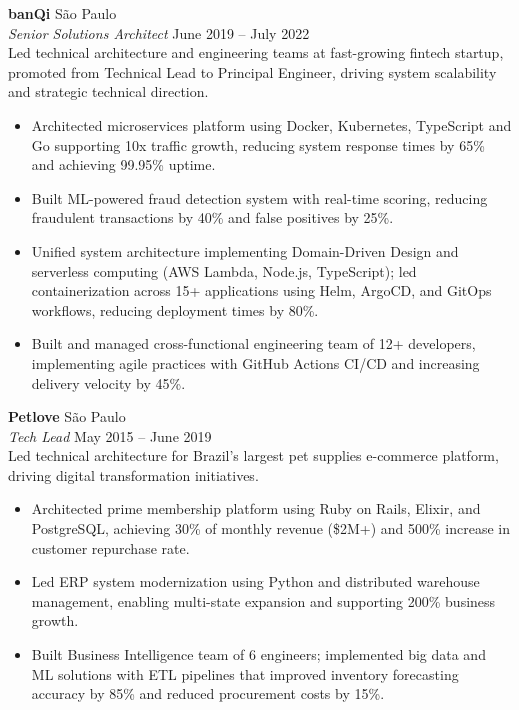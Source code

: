 \documentclass[a4paper]{article}
\begin{document}
\textbf{banQi} \hfill São Paulo\\
\textit{Senior Solutions Architect} \hfill June 2019 -- July 2022\\[2pt]
Led technical architecture and engineering teams at fast-growing fintech startup, promoted from Technical Lead to Principal Engineer, driving system scalability and strategic technical direction.
\vspace{1mm}
\begin{itemize}
\item Architected microservices platform using Docker, Kubernetes, TypeScript and Go supporting 10x traffic growth, reducing system response times by 65\% and achieving 99.95\% uptime.
\item Built ML-powered fraud detection system with real-time scoring, reducing fraudulent transactions by 40\% and false positives by 25\%.
\item Unified system architecture implementing Domain-Driven Design and serverless computing (AWS Lambda, Node.js, TypeScript); led containerization across 15+ applications using Helm, ArgoCD, and GitOps workflows, reducing deployment times by 80\%.
\item Built and managed cross-functional engineering team of 12+ developers, implementing agile practices with GitHub Actions CI/CD and increasing delivery velocity by 45\%.
\end{itemize}
\vspace{1mm}

\textbf{Petlove} \hfill São Paulo\\
\textit{Tech Lead} \hfill May 2015 -- June 2019\\[2pt]
Led technical architecture for Brazil's largest pet supplies e-commerce platform, driving digital transformation initiatives.
\vspace{1mm}
\begin{itemize}
\item Architected prime membership platform using Ruby on Rails, Elixir, and PostgreSQL, achieving 30\% of monthly revenue (\$2M+) and 500\% increase in customer repurchase rate.
\item Led ERP system modernization using Python and distributed warehouse management, enabling multi-state expansion and supporting 200\% business growth.
\item Built Business Intelligence team of 6 engineers; implemented big data and ML solutions with ETL pipelines that improved inventory forecasting accuracy by 85\% and reduced procurement costs by 15\%.
\end{itemize}
\vspace{1mm}
\end{document}
